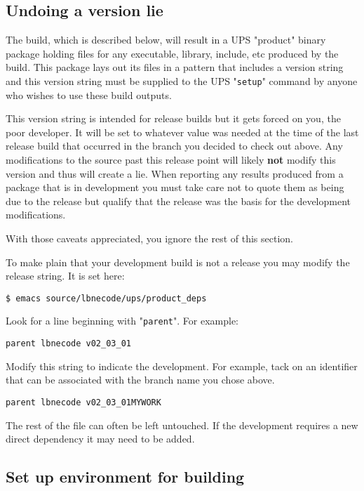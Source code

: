 \documentclass[11pt]{article}
\begin{document}
\subsection{Undoing a version lie}
\label{sec-1-3}

The build, which is described below, will result in a UPS "product" binary package holding files for any executable, library, include, etc produced by the build.  This package lays out its files in a pattern that includes a version string and this version string must be supplied to the UPS "\texttt{setup}" command by anyone who wishes to use these build outputs.

This version string is intended for release builds but it gets forced on you, the poor developer.  It will be set to whatever value was needed at the time of the last release build that occurred in the branch you decided to check out above.  Any modifications to the source past this release point will likely \textbf{not} modify this version and thus will create a lie.  When reporting any results produced from a package that is in development you must take care not to quote them as being due to the release but qualify that the release was the basis for the development modifications.

With those caveats appreciated, you ignore the rest of this section.  

To make plain that your development build is not a release you may modify the release string.  It is set here:

\begin{verbatim}
$ emacs source/lbnecode/ups/product_deps
\end{verbatim}

Look for a line beginning with "\texttt{parent}".  For example: 

\begin{verbatim}
parent lbnecode v02_03_01
\end{verbatim}

Modify this string to indicate the development.  For example, tack on an identifier that can be associated with the branch name you chose above.

\begin{verbatim}
parent lbnecode v02_03_01MYWORK
\end{verbatim}

The rest of the file can often be left untouched.  If the development requires a new direct dependency it may need to be added.  
\subsection{Set up environment for building}
\label{sec-1-4}
\end{document}
